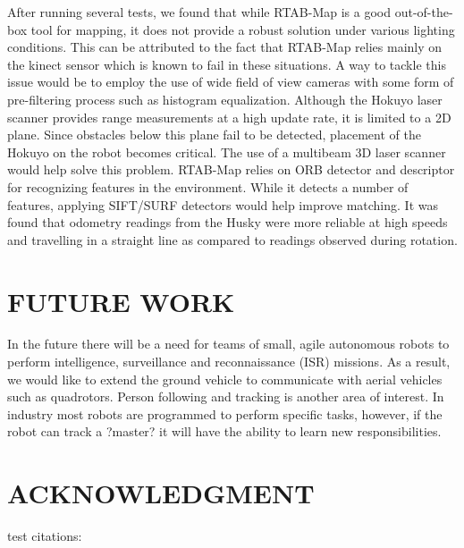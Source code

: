 \documentclass[letterpaper, 10 pt, conference]{ieeeconf}  %
\begin{document}
After running several tests, we found that while RTAB-Map is a good out-of-the-box tool for mapping, it does not provide a robust solution under various lighting conditions. This can be attributed to the fact that RTAB-Map relies mainly on the kinect sensor which is known to fail in these situations. A way to tackle this issue would be to employ the use of wide field of view cameras with some form of pre-filtering process such as histogram equalization.
Although the Hokuyo laser scanner provides range measurements at a high update rate, it is limited to a 2D plane. Since obstacles below this plane fail to be detected, placement of the Hokuyo on the robot becomes critical. The use of a multibeam 3D laser scanner would help solve this problem.
RTAB-Map relies on ORB detector and descriptor for recognizing features in the environment. While it detects a number of features, applying SIFT/SURF detectors would help improve matching. It was found that odometry readings from the Husky were more reliable at high speeds and travelling in a straight line as compared to readings observed during rotation.

\section{FUTURE WORK}

In the future there will be a need for teams of small, agile autonomous robots to perform intelligence, surveillance and reconnaissance (ISR) missions. As a result, we would like to extend the ground vehicle to communicate with aerial vehicles such as quadrotors. Person following and tracking is another area of interest. In industry most robots are programmed to perform specific tasks, however, if the robot can track a ?master? it will have the ability to learn new responsibilities.

\addtolength{\textheight}{-12cm}   %



\section*{ACKNOWLEDGMENT}

test citations:

~\cite{ORB}
~\cite{target}
~\cite{3Dshape}





\end{document}
